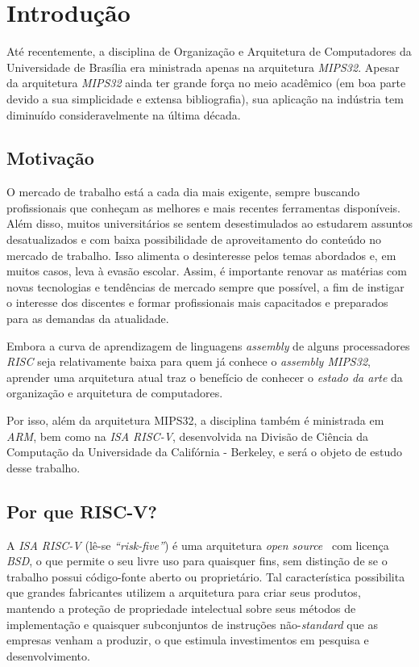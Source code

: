 \chapter{Introdução}\label{cap1_introducao}

{ Até recentemente, a disciplina de Organização e Arquitetura de Computadores
    da Universidade de Brasília era ministrada apenas na
    arquitetura \textit{MIPS32}. Apesar da arquitetura \textit{MIPS32} ainda ter
    grande força no meio acadêmico (em boa parte devido a sua simplicidade e
    extensa bibliografia), sua aplicação na indústria tem diminuído
    consideravelmente na última década.
}

\section{Motivação}
{ O mercado de trabalho está a cada dia mais exigente, sempre buscando
    profissionais que conheçam as melhores e mais recentes ferramentas
    disponíveis. Além disso, muitos universitários se sentem desestimulados
    ao estudarem assuntos desatualizados e com baixa possibilidade de
    aproveitamento do conteúdo no mercado de trabalho. Isso alimenta o
    desinteresse pelos temas abordados e, em muitos casos, leva à evasão
    escolar. Assim, é importante renovar as matérias com novas tecnologias
    e tendências de mercado sempre que possível, a fim de instigar o
    interesse dos discentes e formar profissionais mais capacitados e
    preparados para as demandas da atualidade.
}

{ Embora a curva de aprendizagem de linguagens \textit{assembly} de alguns
    processadores \textit{RISC} seja relativamente baixa para quem já conhece o
    \textit{assembly MIPS32}, aprender uma arquitetura atual traz o benefício de
    conhecer o \textit{estado da arte} da organização e arquitetura de
    computadores.
}

{ Por isso, além da arquitetura MIPS32, a disciplina também é ministrada em
    \textit{ARM}, bem como na \textit{ISA RISC-V}, desenvolvida na Divisão de
    Ciência da Computação da Universidade da Califórnia - Berkeley, e será o
    objeto de estudo desse trabalho.
}


\section{Por que RISC-V?}\label{intro_riscv}
{ A \textit{ISA RISC-V} (lê-se \textit{``risk-five''}) é uma arquitetura
    \textit{open source}~\cite{riscv_spec} com licença \textit{BSD}, o que
    permite o seu livre uso para quaisquer fins, sem distinção de se o trabalho
    possui código-fonte aberto ou proprietário. Tal característica possibilita
    que grandes fabricantes utilizem a arquitetura para criar seus produtos,
    mantendo a proteção de propriedade intelectual sobre seus métodos de
    implementação e quaisquer subconjuntos de instruções não-\textit{standard}
    que as empresas venham a produzir, o que estimula investimentos em pesquisa
    e desenvolvimento.
}

